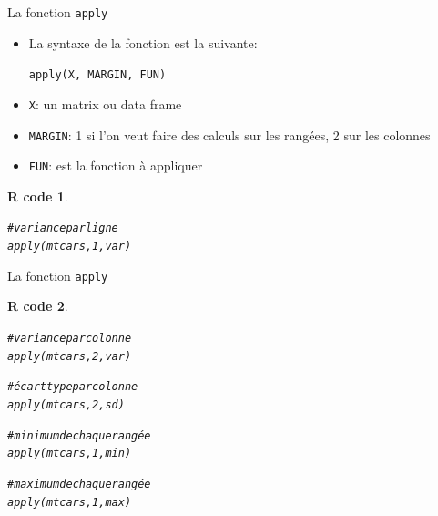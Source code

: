 \documentclass[11pt]{beamer}\usepackage[]{graphicx}\usepackage[]{color}
\makeatletter
\newcommand{\hlnum}[1]{\textcolor[rgb]{0.063,0.58,0.627}{#1}}%
\newcommand{\hlcom}[1]{\textcolor[rgb]{0.588,0.588,0.588}{#1}}%
\newcommand{\hlstd}[1]{\textcolor[rgb]{0.196,0.196,0.196}{#1}}%
\newcommand{\hlkwd}[1]{\textcolor[rgb]{0.78,0.227,0.412}{#1}}%
\newenvironment{kframe}{%
 \def\at@end@of@kframe{}%
 \ifinner\ifhmode%
  \def\at@end@of@kframe{\end{minipage}}%
  \begin{minipage}{\columnwidth}%
 \fi\fi%
 \def\FrameCommand##1{\hskip\@totalleftmargin \hskip-\fboxsep
 \colorbox{shadecolor}{##1}\hskip-\fboxsep
     \hskip-\linewidth \hskip-\@totalleftmargin \hskip\columnwidth}%
 \MakeFramed {\advance\hsize-\width
   \@totalleftmargin\z@ \linewidth\hsize
   \@setminipage}}%
 {\par\unskip\endMakeFramed%
 \at@end@of@kframe}
\newenvironment{knitrout}{}{} %
\newtheorem{rcode}{R code}[section]
\newcommand{\code}[1]{\texttt{#1}}
\makeatother
\begin{document}
\begin{frame}[fragile]{La fonction \code{apply}}
\begin{itemize}
  \setlength\itemsep{1em}
\item La syntaxe de la fonction est la suivante:
\begin{center}
\code{apply(X, MARGIN, FUN)}
\end{center}
\item \code{X}: un matrix ou data frame
\item \code{MARGIN}: 1 si l'on veut faire des calculs sur les rangées, 2 sur les colonnes
\item \code{FUN}: est la fonction à appliquer
\end{itemize}
\pause 
\begin{knitrout}
\color{fgcolor}\begin{kframe}
\begin{rcode}\label{unnamed-chunk-37}\begin{alltt}
\hlcom{# variance par ligne}
\hlkwd{apply}\hlstd{(mtcars,} \hlnum{1}\hlstd{, var)}
\end{alltt}
\end{rcode}\end{kframe}
\end{knitrout}


\end{frame}









\begin{frame}[fragile]{La fonction \code{apply}}
\begin{knitrout}
\color{fgcolor}\begin{kframe}
\begin{rcode}\label{unnamed-chunk-38}\begin{alltt}
\hlcom{# variance par colonne}
\hlkwd{apply}\hlstd{(mtcars,} \hlnum{2}\hlstd{, var)}

\hlcom{# écart type par colonne}
\hlkwd{apply}\hlstd{(mtcars,} \hlnum{2}\hlstd{, sd)}

\hlcom{# minimum de chaque rangée}
\hlkwd{apply}\hlstd{(mtcars,} \hlnum{1}\hlstd{, min)}


\hlcom{# maximum de chaque rangée}
\hlkwd{apply}\hlstd{(mtcars,} \hlnum{1}\hlstd{, max)}
\end{alltt}
\end{rcode}\end{kframe}
\end{knitrout}


\end{frame}
\end{document}

